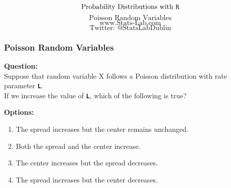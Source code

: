 \documentclass{beamer}
\begin{document}
\begin{frame}
\bigskip
{
\Huge
\[ \mbox{Probability Distributions with \texttt{R}} \]
\huge
\[ \mbox{Poisson Random Variables} \]
}
{
\huge
\[ \mbox{www.Stats-Lab.com} \]
\[ \mbox{Twitter: @StatsLabDublin} \]
}
\end{frame}
\begin{frame}
\frametitle{Poisson Random Variables}
\noindent\textbf{Question:}\\
Suppose that random variable X follows a Poisson distribution with rate parameter \texttt{\textbf{L}}. \\
If we increase the value of \texttt{\textbf{L}}, which of the following is true?


\bigskip
\noindent\textbf{Options:}
\begin{enumerate}
\item The spread increases but the center remains unchanged.
\item Both the spread and the center increase.
\item The center increases but the spread decreases.
\item The spread increases but the center decreases.
\end{enumerate}
\end{frame}
\end{document}
